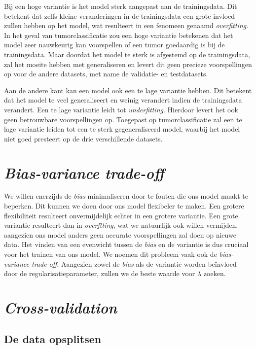 \documentclass[twoside, kulak]{kulakreport}
\begin{document}
	Bij een hoge variantie is het model sterk aangepast aan de trainingsdata. Dit betekent dat zelfs kleine veranderingen in de trainingsdata een grote invloed zullen hebben op het model, wat resulteert in een fenomeen genaamd \textit{overfitting}. In het geval van tumorclassificatie zou een hoge variantie betekenen dat het model zeer nauwkeurig kan voorspellen of een tumor goedaardig is bij de trainingsdata. Maar doordat het model te sterk is afgestemd op de trainingsdata, zal het moeite hebben met generaliseren en levert dit geen precieze voorspellingen op voor de andere datasets, met name de validatie- en testdatasets.
	
	Aan de andere kant kan een model ook een te lage variantie hebben. Dit betekent dat het model te veel generaliseert en weinig verandert indien de trainingsdata verandert. Een te lage variantie leidt tot \textit{underfitting}. Hierdoor levert het ook geen betrouwbare voorspellingen op. Toegepast op tumorclassificatie zal een te lage variantie leiden tot een te sterk gegeneraliseerd model, waarbij het model niet goed presteert op de drie verschillende datasets.
	
	\section{\textit{Bias-variance trade-off}}
	
	We willen enerzijds de \textit{bias} minimaliseren door te fouten die ons model maakt te beperken. Dit kunnen we doen door ons model flexibeler te maken. Een grotere flexibiliteit resulteert onvermijdelijk echter in een grotere variantie. Een grote variantie resulteert dan in \textit{overftting}, wat we natuurlijk ook willen vermijden, aangezien ons model anders geen accurate voorspellingen zal doen op nieuwe data. Het vinden van een evenwicht tussen de \textit{bias} en de variantie is dus cruciaal voor het trainen van ons model. We noemen dit probleem vaak ook de \textit{bias-variance trade-off}. Aangezien zowel de \textit{bias} als de variantie worden beïnvloed door de regularisatieparameter, zullen we de beste waarde voor \(\lambda\) zoeken.
	
	\section{\textit{Cross-validation}}
	
	\subsection{De data opsplitsen}
	
\end{document}
